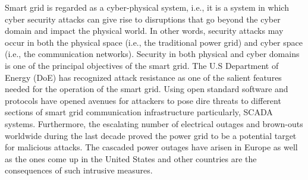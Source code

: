 \documentclass[preprint,number,12pt]{elsarticle}
\begin{document}
Smart grid is regarded as a cyber-physical system, i.e., it is a system in which cyber security attacks can give rise to disruptions that go beyond the cyber domain and impact the physical world\citep{Mo2012}. In other words, security attacks may occur in both the physical space (i.e., the traditional power grid) and cyber space (i.e., the communication networks). Security in both physical and cyber domains is one of the principal objectives of the smart grid\citep{Li2012}. The U.S Department of Energy (DoE) has recognized attack resistance as one of the salient features needed for the operation of the smart grid\citep{Chen2012}. Using open standard software and protocols have opened avenues for attackers to pose dire threats to different sections of smart grid communication infrastructure particularly, SCADA systems. Furthermore, the escalating number of electrical outages and brown-outs worldwide during the last decade proved the power grid to be a potential target for malicious attacks. The cascaded power outages have arisen in Europe\citep{Pearson20115211} as well as the ones come up in the United States and other countries\citep{Amin2005,Amin2012} are the consequences of such intrusive measures.
\end{document}
